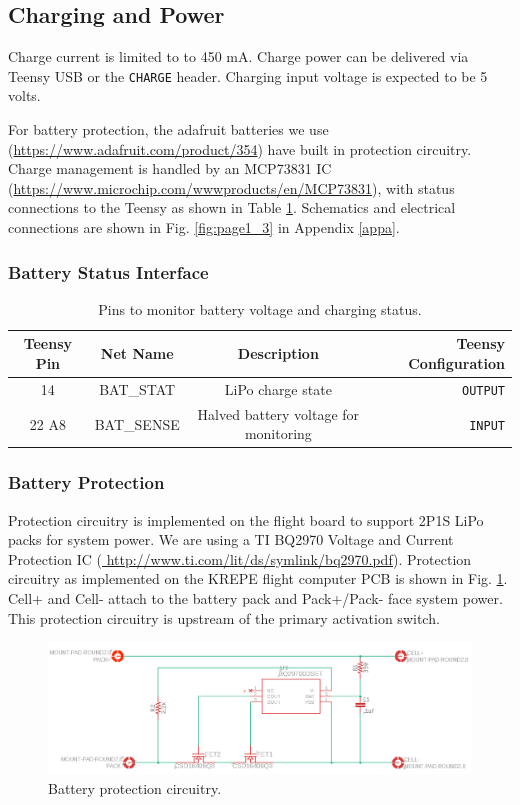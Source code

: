 \documentclass{article}
\begin{document}
\subsection{Charging and Power}

Charge current is limited to to 450 mA. Charge power can be delivered via Teensy USB or the \texttt{CHARGE} header. Charging input voltage is expected to be 5 volts.

For battery protection, the adafruit batteries we use (\url{https://www.adafruit.com/product/354}) have built in protection circuitry. Charge management is handled by an MCP73831 IC (\url{https://www.microchip.com/wwwproducts/en/MCP73831}), with status connections to the Teensy as shown in Table \ref{tab:pins-battery}. Schematics and electrical connections are shown in Fig. \ref{fig:page1_3} in Appendix \ref{appa}.

\subsubsection{Battery Status Interface}
\begin{table}[H]
    \centering
    \begin{tabular}{c|c|c|r}
    Teensy Pin & Net Name  & Description   & Teensy Configuration \\
    \hline 
    14 & BAT\_STAT & LiPo charge state & \texttt{OUTPUT} \\
    22 A8 & BAT\_SENSE    &  Halved battery voltage for monitoring &   \texttt{INPUT} 
    \end{tabular}
    \caption{Pins to monitor battery voltage and charging status.}
    \label{tab:pins-battery}
\end{table}

\subsubsection{Battery Protection}
Protection circuitry is implemented on the flight board to support 2P1S LiPo packs for system power. We are using a TI BQ2970 Voltage and Current Protection IC (\url{ http://www.ti.com/lit/ds/symlink/bq2970.pdf}). Protection circuitry as implemented on the KREPE flight computer PCB is shown in Fig. \ref{fig:bat-protec}.  Cell+ and Cell- attach to the battery pack and Pack+/Pack- face system power. This protection circuitry is upstream of the primary activation switch.

\begin{figure}[H]
    \centering
    \includegraphics[width=\textwidth]{images/battery_protection_schematic.png}
    \caption{Battery protection circuitry.}
    \label{fig:bat-protec}
\end{figure}
\end{document}
